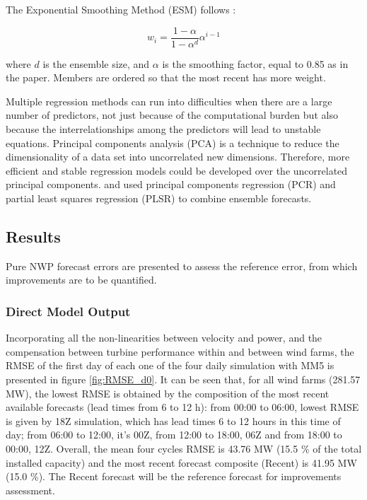 The Exponential Smoothing Method (ESM) follows \cite{YussoufStensrud2007}:

\begin{equation}
    w_i = \frac{1-\alpha}{1-\alpha^d} \alpha^{i-1}
    \label{eq:esm}
\end{equation}

where $d$ is the ensemble size, and $\alpha$ is the smoothing factor, equal to 0.85 as in the paper. Members are ordered so that the most recent has more weight.

Multiple regression methods can run into difficulties when there are a large number of predictors, not just because of the computational burden but also because the interrelationships among the predictors will lead to unstable equations. Principal components analysis (PCA) is a technique to reduce the dimensionality of a data set into uncorrelated new dimensions. Therefore, more efficient and stable regression models could be developed over the uncorrelated principal components. \cite{Merz1997} and \cite{MoStraus2002} used principal components regression (PCR) and partial least squares regression (PLSR) to combine ensemble forecasts. 

\subsection{Results}

Pure NWP forecast errors are presented to assess the reference error, from which improvements are to be quantified. 

\FloatBarrier
\subsubsection{Direct Model Output}

Incorporating all the non-linearities between velocity and power, and the compensation between turbine performance within and between wind farms, the RMSE of the first day of each one of the four daily simulation with MM5 is presented in figure \ref{fig:RMSE_d0}. It can be seen that, for all wind farms (281.57 MW), the lowest RMSE is obtained by the composition of the most recent available forecasts (lead times from 6 to 12 h): from 00:00 to 06:00, lowest RMSE is given by 18Z simulation, which has lead times 6 to 12 hours in this time of day; from 06:00 to 12:00, it's 00Z, from 12:00 to 18:00, 06Z and from 18:00 to 00:00, 12Z. Overall, the mean four cycles RMSE is 43.76 MW (15.5 \% of the total installed capacity) and the most recent forecast composite (Recent) is 41.95 MW (15.0 \%). The Recent forecast will be the reference forecast for improvements assessment. 

